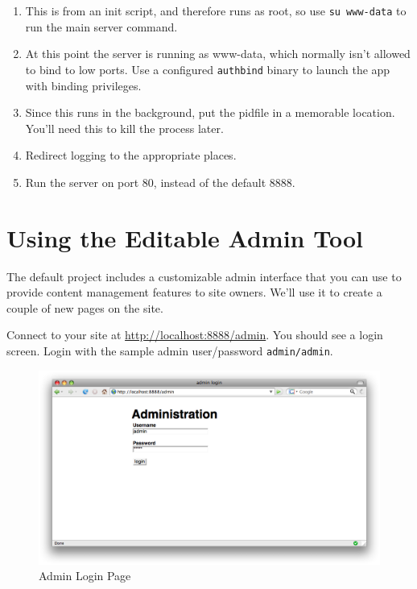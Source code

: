 \begin{flushleft}
\begin{enumerate}
    \item This is from an init script, and therefore runs as root, so use
        \verb|su www-data| to run the main server command.
    \item At this point the server is running as www-data, which normally
        isn't allowed to bind to low ports. Use a configured \verb|authbind|
        binary to launch the app with binding privileges.
    \item Since this runs in the background, put the pidfile in a memorable
        location. You'll need this to kill the process later.
    \item Redirect logging to the appropriate places.
    \item Run the server on port 80, instead of the default 8888.
\end{enumerate}
\end{flushleft}

\section{Using the Editable Admin Tool}

The default project includes a customizable admin interface that you can use
to provide content management features to site owners. We'll use it to create
a couple of new pages on the site.

Connect to your site at \href{http://localhost:8888/admin}{http://localhost:8888/admin}.
You should see a login screen. Login with the sample admin user/password
\verb|admin/admin|.

\begin{figure}[ht]
\centering
\includegraphics[width=1\textwidth]{images/admin-intro/02-admin-login.png}
\caption{Admin Login Page}
\end{figure}

